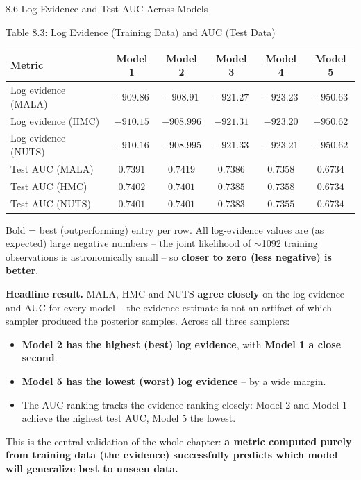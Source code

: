 \documentclass[aspectratio=169,10pt]{beamer}
\begin{document}
\begin{frame}[allowframebreaks]{8.6 Log Evidence and Test AUC Across Models}

\begin{block}{Table 8.3: Log Evidence (Training Data) and AUC (Test Data)}
\centering\scriptsize
\begin{tabular}{lccccc}
\toprule
Metric & Model 1 & Model 2 & Model 3 & Model 4 & Model 5\\
\midrule
Log evidence (MALA) & $-909.86$ & $\mathbf{-908.91}$ & $-921.27$ & $-923.23$ & $-950.63$\\
Log evidence (HMC)  & $-910.15$ & $\mathbf{-908.996}$ & $-921.31$ & $-923.20$ & $-950.62$\\
Log evidence (NUTS) & $-910.16$ & $\mathbf{-908.995}$ & $-921.33$ & $-923.21$ & $-950.62$\\
Test AUC (MALA) & $0.7391$ & $\mathbf{0.7419}$ & $0.7386$ & $0.7358$ & $0.6734$\\
Test AUC (HMC)  & $\mathbf{0.7402}$ & $0.7401$ & $0.7385$ & $0.7358$ & $0.6734$\\
Test AUC (NUTS) & $\mathbf{0.7401}$ & $\mathbf{0.7401}$ & $0.7383$ & $0.7355$ & $0.6734$\\
\bottomrule
\end{tabular}
\end{block}
Bold = best (outperforming) entry per row. All log-evidence values are (as expected) large negative numbers -- the joint likelihood of $\sim$1092 training observations is astronomically small -- so \textbf{closer to zero (less negative) is better}.

\framebreak

\textbf{Headline result.} MALA, HMC and NUTS \textbf{agree closely} on the log evidence and AUC for every model -- the evidence estimate is not an artifact of which sampler produced the posterior samples. Across all three samplers:
\begin{itemize}
  \item \textbf{Model 2 has the highest (best) log evidence}, with \textbf{Model 1 a close second}.
  \item \textbf{Model 5 has the lowest (worst) log evidence} -- by a wide margin.
  \item The AUC ranking tracks the evidence ranking closely: Model 2 and Model 1 achieve the highest test AUC, Model 5 the lowest.
\end{itemize}
This is the central validation of the whole chapter: \textbf{a metric computed purely from training data (the evidence) successfully predicts which model will generalize best to unseen data.}

\end{frame}
\end{document}
